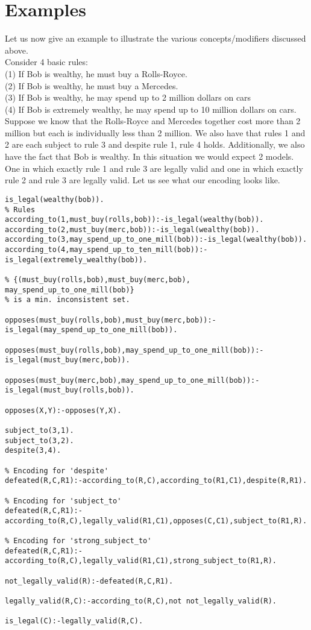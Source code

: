 \section{Examples}
Let us now give an example to illustrate the various concepts/modifiers discussed above.\\
\newline
Consider 4 basic rules:\\
(1) If Bob is wealthy, he must buy a Rolls-Royce.\\
(2) If Bob is wealthy, he must buy a Mercedes.\\
(3) If Bob is wealthy, he may spend up to 2 million dollars on cars\\
(4) If Bob is extremely wealthy, he may spend up to 10 million dollars on cars.\\
\newline
Suppose we know that the Rolls-Royce and Mercedes together cost more than 2 million but each is individually less than 2 million. We also have that rules 1 and 2 are each subject to rule 3 and despite rule 1, rule 4 holds. Additionally, we also have the fact that Bob is wealthy. In this situation we would expect 2 models. One in which exactly rule 1 and rule 3 are legally valid and one in which exactly rule 2 and rule 3 are legally valid. Let us see what our encoding looks like.
\begin{verbatim}
is_legal(wealthy(bob)).
% Rules
according_to(1,must_buy(rolls,bob)):-is_legal(wealthy(bob)).
according_to(2,must_buy(merc,bob)):-is_legal(wealthy(bob)).
according_to(3,may_spend_up_to_one_mill(bob)):-is_legal(wealthy(bob)).
according_to(4,may_spend_up_to_ten_mill(bob)):-is_legal(extremely_wealthy(bob)).

% {(must_buy(rolls,bob),must_buy(merc,bob), may_spend_up_to_one_mill(bob)} 
% is a min. inconsistent set.

opposes(must_buy(rolls,bob),must_buy(merc,bob)):-is_legal(may_spend_up_to_one_mill(bob)).

opposes(must_buy(rolls,bob),may_spend_up_to_one_mill(bob)):-is_legal(must_buy(merc,bob)).

opposes(must_buy(merc,bob),may_spend_up_to_one_mill(bob)):-is_legal(must_buy(rolls,bob)).

opposes(X,Y):-opposes(Y,X).

subject_to(3,1).
subject_to(3,2).
despite(3,4).

% Encoding for 'despite'
defeated(R,C,R1):-according_to(R,C),according_to(R1,C1),despite(R,R1).

% Encoding for 'subject_to'
defeated(R,C,R1):-according_to(R,C),legally_valid(R1,C1),opposes(C,C1),subject_to(R1,R).

% Encoding for 'strong_subject_to'
defeated(R,C,R1):-according_to(R,C),legally_valid(R1,C1),strong_subject_to(R1,R).

not_legally_valid(R):-defeated(R,C,R1).

legally_valid(R,C):-according_to(R,C),not not_legally_valid(R).

is_legal(C):-legally_valid(R,C).

\end{verbatim}

